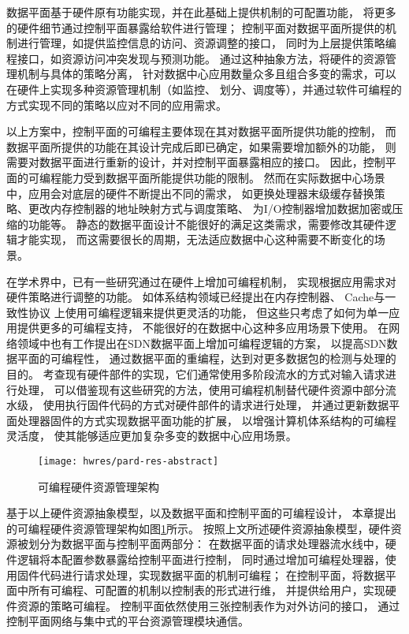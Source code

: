 数据平面基于硬件原有功能实现，并在此基础上提供机制的可配置功能，
将更多的硬件细节通过控制平面暴露给软件进行管理；
控制平面对数据平面所提供的机制进行管理，如提供监控信息的访问、资源调整的接口，
同时为上层提供策略编程接口，如资源访问冲突发现与预测功能。
通过这种抽象方法，将硬件的资源管理机制与具体的策略分离，
针对数据中心应用数量众多且组合多变的需求，可以在硬件上实现多种资源管理机制（如监控、
划分、调度等），并通过软件可编程的方式实现不同的策略以应对不同的应用需求。

以上方案中，控制平面的可编程主要体现在其对数据平面所提供功能的控制，
而数据平面所提供的功能在其设计完成后即已确定，如果需要增加额外的功能，
则需要对数据平面进行重新的设计，并对控制平面暴露相应的接口。
因此，控制平面的可编程能力受到数据平面所能提供功能的限制。
然而在实际数据中心场景中，应用会对底层的硬件不断提出不同的需求，
如更换处理器末级缓存替换策略、更改内存控制器的地址映射方式与调度策略、
为I/O控制器增加数据加密或压缩的功能等。
静态的数据平面设计不能很好的满足这类需求，需要修改其硬件逻辑才能实现，
而这需要很长的周期，无法适应数据中心这种需要不断变化的场景。

在学术界中，已有一些研究通过在硬件上增加可编程机制，
实现根据应用需求对硬件策略进行调整的功能。
如体系结构领域已经提出在内存控制器\cite{bojnordi_pardis:_2012, martin2009, kornaros2003}、
Cache与一致性协议\cite{kuskin1994, reinhardt1994, impulse1999, pong1998}
上使用可编程逻辑来提供更灵活的功能，
但这些只考虑了如何为单一应用提供更多的可编程支持，
不能很好的在数据中心这种多应用场景下使用。
在网络领域中也有工作提出在SDN数据平面上增加可编程逻辑的方案，
以提高SDN数据平面的可编程性\cite{p4_2014, song2013, jeyakumar2013, sivaraman2013}，
通过数据平面的重编程，达到对更多数据包的检测与处理的目的。
考查现有硬件部件的实现，它们通常使用多阶段流水的方式对输入请求进行处理，
可以借鉴现有这些研究的方法，使用可编程机制替代硬件资源中部分流水级，
使用执行固件代码的方式对硬件部件的请求进行处理，
并通过更新数据平面处理器固件的方式实现数据平面功能的扩展，
以增强计算机体系结构的可编程灵活度，
使其能够适应更加复杂多变的数据中心应用场景。

\begin{figure}[tb]
  \centering
  \texttt{[image: hwres/pard-res-abstract]}
  \caption{可编程硬件资源管理架构}
  \label{fig:pard-res-abstract}
\end{figure}

基于以上硬件资源抽象模型，以及数据平面和控制平面的可编程设计，
本章提出的可编程硬件资源管理架构如图\ref{fig:pard-res-abstract}所示。
按照上文所述硬件资源抽象模型，硬件资源被划分为数据平面与控制平面两部分：
在数据平面的请求处理器流水线中，硬件逻辑将本配置参数暴露给控制平面进行控制，
同时通过增加可编程处理器，使用固件代码进行请求处理，实现数据平面的机制可编程；
在控制平面，将数据平面中所有可编程、可配置的机制以控制表的形式进行维，
并提供给用户，实现硬件资源的策略可编程。
控制平面依然使用三张控制表作为对外访问的接口，
通过控制平面网络与集中式的平台资源管理模块通信。


